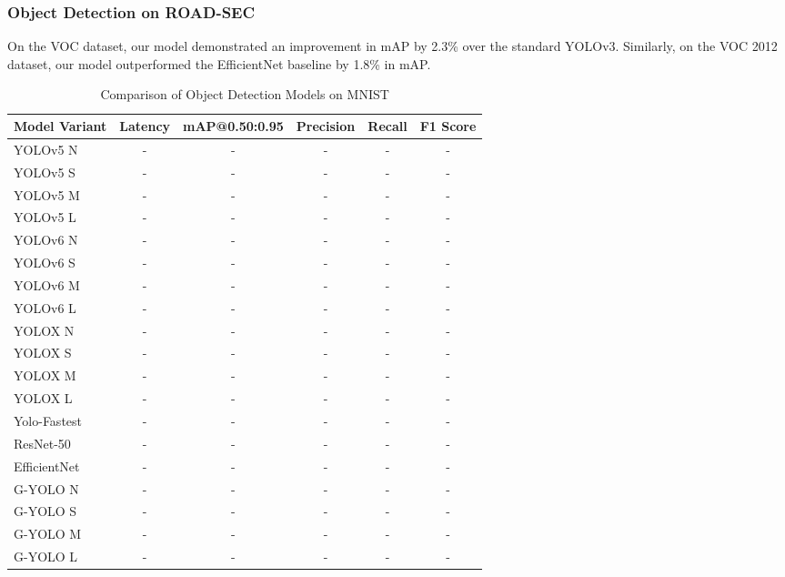 \subsubsection{Object Detection on ROAD-SEC}

On the VOC dataset, our model demonstrated an improvement in mAP by 2.3\% over the standard YOLOv3. Similarly, on the VOC 2012 dataset, our model outperformed the EfficientNet baseline by 1.8\% in mAP.

\begin{table}[htbp]
    \centering
    \caption{Comparison of Object Detection Models on MNIST}
    \label{tab:mnist_model_comparison}
    \begin{tabularx}{\textwidth}{@{}Xccccc@{}}
    \toprule
    Model Variant & Latency & mAP@0.50:0.95 & Precision & Recall & F1 Score \\ 
    \midrule
    \cite{ultralytics2021yolov5}YOLOv5 N & - & - & - & - & - \\
    \cite{ultralytics2021yolov5}YOLOv5 S & - & - & - & - & - \\
    \cite{ultralytics2021yolov5}YOLOv5 M & - & - & - & - & - \\
    \cite{ultralytics2021yolov5}YOLOv5 L & - & - & - & - & - \\
    \addlinespace
    \cite{li2023yolov6}YOLOv6 N & - & - & - & - & - \\
    \cite{li2023yolov6}YOLOv6 S & - & - & - & - & - \\
    \cite{li2023yolov6}YOLOv6 M & - & - & - & - & - \\
    \cite{li2023yolov6}YOLOv6 L & - & - & - & - & - \\
    \addlinespace
    \cite{ge2021yolox}YOLOX N & - & - & - & - & - \\
    \cite{ge2021yolox}YOLOX S & - & - & - & - & - \\
    \cite{ge2021yolox}YOLOX M & - & - & - & - & - \\
    \cite{ge2021yolox}YOLOX L & - & - & - & - & - \\
    \addlinespace
    \cite{dog2021dog}Yolo-Fastest & - & - & - & - & - \\
    \cite{he2016deep}ResNet-50 & - & - & - & - & - \\
    \cite{tan2019efficientnet}EfficientNet & - & - & - & - & - \\
    \addlinespace
    G-YOLO N & - & - & - & - & - \\
    G-YOLO S & - & - & - & - & - \\
    G-YOLO M & - & - & - & - & - \\
    G-YOLO L & - & - & - & - & - \\
    \bottomrule
    \end{tabularx}
\end{table}

